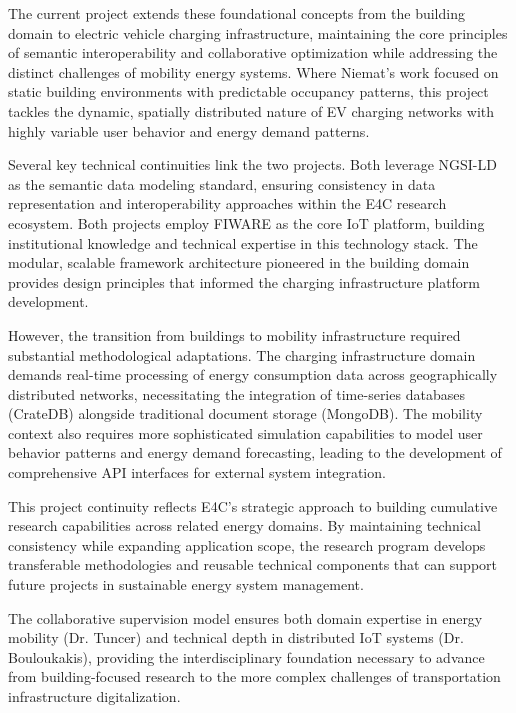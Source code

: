 The current project extends these foundational concepts from the building domain 
to electric vehicle charging infrastructure, maintaining the core principles of 
semantic interoperability and collaborative optimization while addressing the 
distinct challenges of mobility energy systems. Where Niemat's work focused on 
static building environments with predictable occupancy patterns, this project 
tackles the dynamic, spatially distributed nature of EV charging networks with 
highly variable user behavior and energy demand patterns.

Several key technical continuities link the two projects. Both leverage NGSI-LD 
as the semantic data modeling standard, ensuring consistency in data representation 
and interoperability approaches within the E4C research ecosystem. Both projects 
employ FIWARE as the core IoT platform, building institutional knowledge and 
technical expertise in this technology stack. The modular, scalable framework 
architecture pioneered in the building domain provides design principles that 
informed the charging infrastructure platform development.

However, the transition from buildings to mobility infrastructure required 
substantial methodological adaptations. The charging infrastructure domain demands 
real-time processing of energy consumption data across geographically distributed 
networks, necessitating the integration of time-series databases (CrateDB) alongside 
traditional document storage (MongoDB). The mobility context also requires more 
sophisticated simulation capabilities to model user behavior patterns and energy 
demand forecasting, leading to the development of comprehensive API interfaces 
for external system integration.

This project continuity reflects E4C's strategic approach to building cumulative 
research capabilities across related energy domains. By maintaining technical 
consistency while expanding application scope, the research program develops 
transferable methodologies and reusable technical components that can support 
future projects in sustainable energy system management.

The collaborative supervision model ensures both domain expertise in energy mobility 
(Dr. Tuncer) and technical depth in distributed IoT systems (Dr. Bouloukakis), 
providing the interdisciplinary foundation necessary to advance from building-focused 
research to the more complex challenges of transportation infrastructure digitalization.

